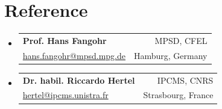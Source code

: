 \documentclass[A4,11pt]{article}
\makeatletter
\newcommand{\CVSubheading}[4]{
  \vspace{-2pt}\item
    \begin{tabular*}{0.97\textwidth}[t]{l@{\extracolsep{\fill}}r}
      \textbf{#1} & #2 \\
      \small#3 & \small #4 \\
    \end{tabular*}\vspace{-7pt}
}
\newcommand{\CVSubHeadingListStart}{\begin{itemize}[leftmargin=0.5cm, label={}]}
\newcommand{\CVSubHeadingListEnd}{\end{itemize}}
\makeatother
\begin{document}
\section{Reference}
\CVSubHeadingListStart
\CVSubheading
{Prof. Hans Fangohr}{MPSD, CFEL}
{\href{mailto:hans.fangohr@mpsd.mpg.de}{hans.fangohr@mpsd.mpg.de}}{Hamburg, Germany}
\CVSubheading
{Dr. habil. Riccardo Hertel}{IPCMS, CNRS}
{\href{mailto:hertel@ipcms.unistra.fr}{hertel@ipcms.unistra.fr}}{Strasbourg, France}
\CVSubHeadingListEnd
\end{document}
